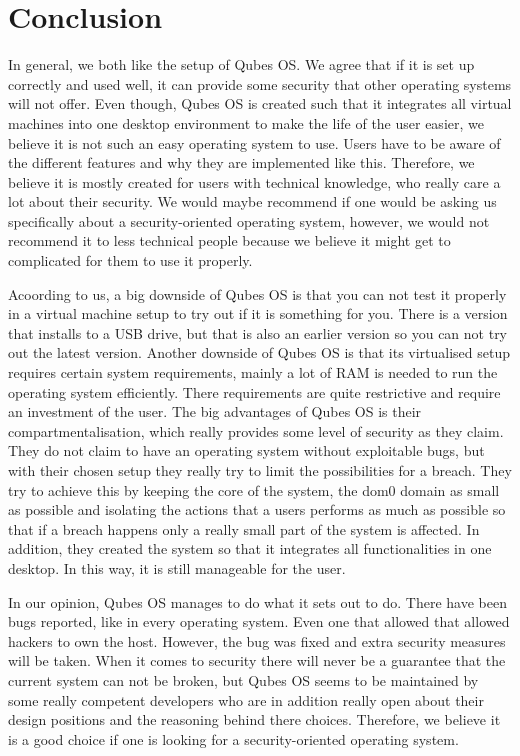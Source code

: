 \documentclass[runningheads,a4paper]{article}
\begin{document}
\section{Conclusion}
In general, we both like the setup of Qubes OS. We agree that if it is set up correctly and used well, it can provide some security that other operating systems will not offer. Even though, Qubes OS is created such that it integrates all virtual machines into one desktop environment to make the life of the user easier, we believe it is not such an easy operating system to use. Users have to be aware of the different features and why they are implemented like this. Therefore, we believe it is mostly created for users with technical knowledge, who really care a lot about their security. We would maybe recommend if one would be asking us specifically about a security-oriented operating system, however, we would not recommend it to less technical people because we believe it might get to complicated for them to use it properly.

Acoording to us, a big downside of Qubes OS is that you can not test it properly in a virtual machine setup to try out if it is something for you. There is a version that installs to a USB drive, but that is also an earlier version so you can not try out the latest version. Another downside of Qubes OS is that its virtualised setup requires certain system requirements, mainly a lot of RAM is needed to run the operating system efficiently. There requirements are quite restrictive and require an investment of the user.
The big advantages of Qubes OS is their compartmentalisation, which really provides some level of security as they claim. They do not claim to have an operating system without exploitable bugs, but with their chosen setup they really try to limit the possibilities for a breach. They try to achieve this by keeping the core of the system, the dom0 domain as small as possible and isolating the actions that a users performs as much as possible so that if a breach happens only a really small part of the system is affected. In addition, they created the system so that it integrates all functionalities in one desktop. In this way, it is still manageable for the user.

In our opinion, Qubes OS manages to do what it sets out to do. There have been bugs reported, like in every operating system. Even one that allowed that allowed hackers to own the host. However, the bug was fixed and extra security measures will be taken. When it comes to security there will never be a guarantee that the current system can not be broken, but Qubes OS seems to be maintained by some really competent developers who are in addition really open about their design positions and the reasoning behind there choices. Therefore, we believe it is a good choice if one is looking for a security-oriented operating system.
\nocite{*}





\end{document}
